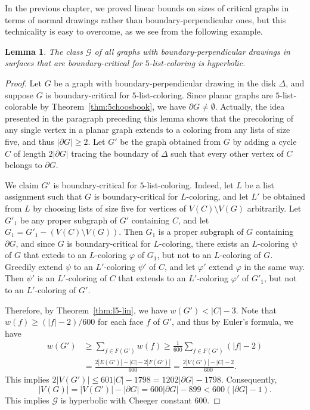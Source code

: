 \documentclass[12pt,twoside,openright,a4paper]{book}
\newtheorem{lemma}[theorem]{Lemma}
\newcommand{\GG}{\mathcal{G}}
\begin{document}
In the previous chapter, we proved linear bounds on sizes of critical graphs in terms of normal drawings rather than boundary-perpendicular ones,
but this technicality is easy to overcome, as we see from the following example.
\begin{lemma}
The class $\GG$ of all graphs with boundary-perpendicular drawings in surfaces that are boundary-critical for $5$-list-coloring
is hyperbolic.
\end{lemma}
\begin{proof}
Let $G$ be a graph with boundary-perpendicular drawing in the disk $\Delta$, and suppose $G$ is boundary-critical for $5$-list-coloring.
Since planar graphs are $5$-list-colorable by Theorem~\ref{thm:5choosbook}, we have $\partial G\neq\emptyset$.
Actually, the idea presented in the paragraph preceding this lemma shows that the precoloring of any single vertex in
a planar graph extends to a coloring from any lists of size five, and thus $|\partial G|\ge 2$.  Let $G'$ be the graph
obtained from $G$ by adding a cycle $C$ of length $2|\partial G|$ tracing the boundary of $\Delta$ such that every other
vertex of $C$ belongs to $\partial G$.

We claim $G'$ is boundary-critical for $5$-list-coloring.  Indeed, let $L$ be a list assignment such that $G$ is
boundary-critical for $L$-coloring, and let $L'$ be obtained from $L$ by choosing lists of size five for vertices of $V(C)\setminus V(G)$
arbitrarily.  Let $G'_1$ be any proper subgraph of $G'$ containing $C$, and let $G_1=G'_1-(V(C)\setminus V(G))$.  Then $G_1$
is a proper subgraph of $G$ containing $\partial G$, and since $G$ is boundary-critical for $L$-coloring, there exists an $L$-coloring $\psi$
of $G$ that exteds to an $L$-coloring $\varphi$ of $G_1$, but not to an $L$-coloring of $G$.
Greedily extend $\psi$ to an $L'$-coloring $\psi'$ of $C$, and let $\varphi'$ extend $\varphi$ in the same way.
Then $\psi'$ is an $L'$-coloring of $C$ that extends to an $L'$-coloring $\varphi'$ of $G'_1$, but not to an $L'$-coloring of $G'$.

Therefore, by Theorem~\ref{thm:l5-lin}, we have $w(G')<|C|-3$.  Note that $w(f)\ge(|f|-2)/600$ for each face $f$ of $G'$,
and thus by Euler's formula, we have
\begin{align*}
w(G')&\ge \sum_{f\in F(G')} w(f)\ge \frac{1}{600}\sum_{f\in F(G')}(|f|-2)\\
&=\frac{2|E(G')|-|C|-2|F(G')|}{600}=\frac{2|V(G')|-|C|-2}{600}.
\end{align*}
This implies $2|V(G')|\le 601|C|-1798=1202|\partial G|-1798$.  Consequently,
$$|V(G)|=|V(G')|-|\partial G|=600|\partial G|-899<600(|\partial G|-1).$$
This implies $\GG$ is hyperbolic with Cheeger constant $600$.
\end{proof}
\end{document}
